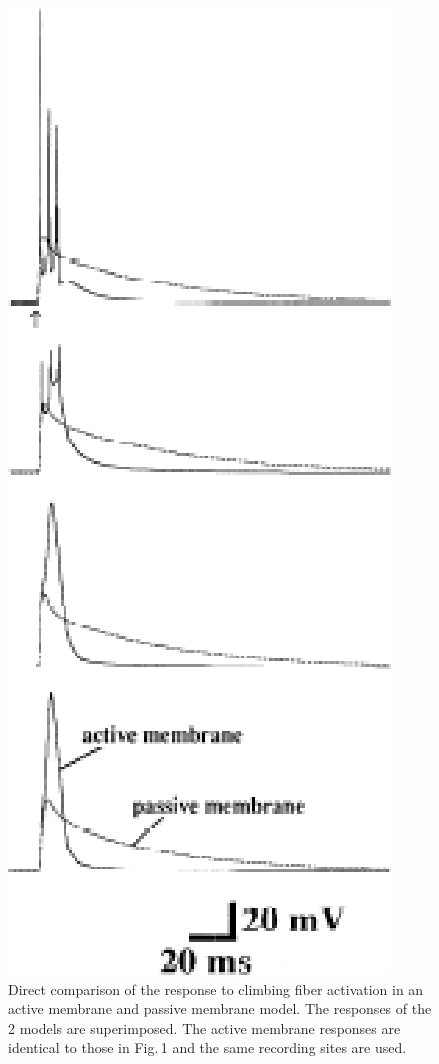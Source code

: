 \documentclass[12pt]{article}
\begin{document}
\begin{figure}[h]
\centering
   \includegraphics[scale=0.75]{figures/Fig.2.3.eps}
   \caption{Direct comparison of the response to climbing fiber activation in an active membrane and passive membrane model. The responses of the 2 models are superimposed. The active membrane responses are identical to those in Fig.\,1 and the same recording sites are used.}
   \label{fig:DS2.3}
\end{figure}
\end{document}
